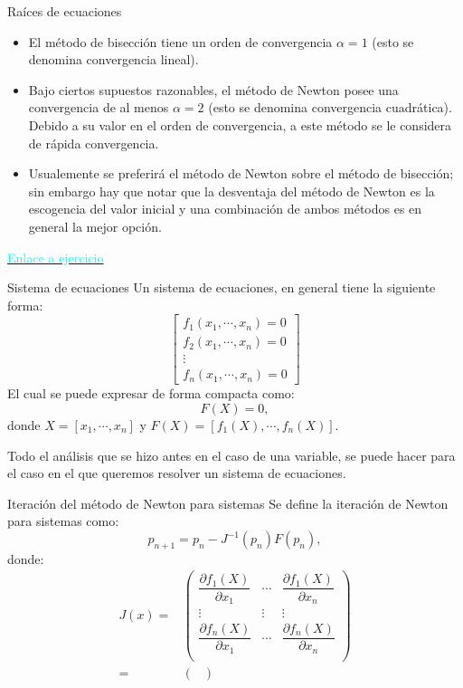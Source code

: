 \begin{frame}{Raíces de ecuaciones}
\begin{itemize}
\item El método de bisección tiene un orden de convergencia $\alpha=1$ (esto se denomina convergencia  lineal).
\item Bajo ciertos supuestos razonables, el método de Newton posee una convergencia de al menos $\alpha=2$ (esto se denomina convergencia  cuadrática). Debido a su valor en el orden de convergencia, a este método se le considera de rápida convergencia.
\item Usualemente se preferirá el método de Newton sobre el método de bisección; sin embargo hay que notar que la desventaja del método de Newton es la escogencia del valor inicial y una combinación de ambos métodos es en general la mejor opción.
\end{itemize}
\hyperlink{EjercicioNewton}{\textcolor{cyan}{Enlace a ejercicio}}
\framebreak
\label{RetornoTeoremaRaices10}
\begin{block}{Sistema de ecuaciones}
Un sistema de ecuaciones, en general tiene la siguiente forma:
\begin{displaymath}
\begin{bmatrix}
f_1(x_1,\cdots ,x_n)=0\\
f_2(x_1,\cdots ,x_n)=0\\
\vdots\\
f_n(x_1,\cdots ,x_n)=0
\end{bmatrix}
\end{displaymath}
El cual se puede expresar de forma compacta como:
$$F(X)=0,$$
donde $X=[x_1,\cdots,x_n]$ y $F(X)=[f_1(X),\cdots,f_n(X)].$
\end{block}
\indent Todo el análisis que se hizo antes en el caso de una variable, se puede hacer para el caso en el que queremos resolver un sistema de ecuaciones.\\[2cm]
\small
\begin{block}{Iteración del método de Newton para sistemas}
Se define la iteración de Newton para sistemas como:
$$p_{n+1}=p_{n}-J^{-1}(p_{n})F(p_{n}),$$
donde:
\begin{align*}
J(x)=&
\begin{pmatrix}
\dfrac{\partial f_1(X)}{\partial x_1} & \cdots & \dfrac{\partial f_1(X)}{\partial x_n}\\
\vdots &\vdots &\vdots\\
\dfrac{\partial f_n(X)}{\partial x_1} & \cdots & \dfrac{\partial f_n(X)}{\partial x_n}\\
\end{pmatrix}\\
=&
\begin{pmatrix}

\end{pmatrix}
\end{align*}
\end{block}
\end{frame}
